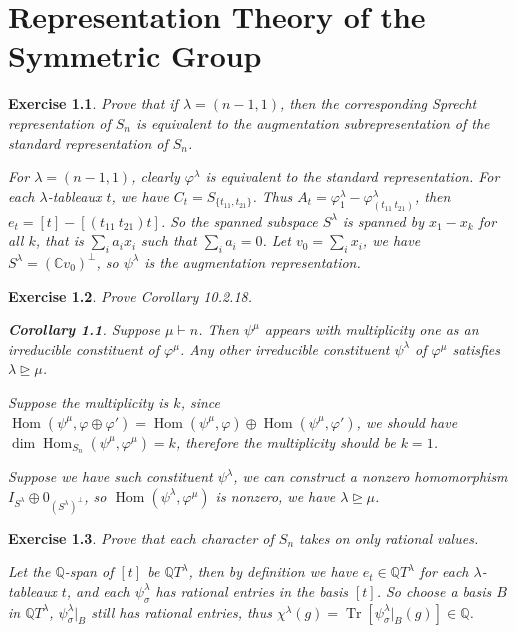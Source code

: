 \documentclass[11pt]{report}
\newtheorem*{corollary}{Corollary}
\theoremstyle{mythm}
\let\oldendproof\endproof
\renewenvironment{proof}[1][\proofname]{%
  \oldproof[\normalfont \bfseries #1]%
}{\oldendproof}
\newtheorem{exercise}{Exercise}[chapter]
\renewcommand*{\proofname}{Proof}
\theoremstyle{myans}
\newcommand{\bbQ}{\mathbb Q}
\newcommand{\bbC}{\mathbb C}
\DeclareMathOperator{\Hom}{Hom}
\DeclareMathOperator{\Tr}{Tr}
\begin{document}
\setcounter{chapter}{9}
\chapter{Representation Theory of the Symmetric Group}

\setcounter{exercise}{2}
\begin{exercise}
  Prove that if $\lambda = (n - 1, 1)$, then the corresponding Sprecht
  representation of $S_n$ is equivalent to the augmentation subrepresentation of the
  standard representation of $S_n$.
  \begin{proof}
    For $\lambda = (n-1, 1)$, clearly $\varphi^\lambda$ is equivalent to the standard representation.
    For each $\lambda$-tableaux $t$, we have $C_t = S_{\{t_{11}, t_{21}\}}$. Thus
    $A_t = \varphi_1^\lambda - \varphi_{(t_{11}\ t_{21})}^\lambda$, then
    $e_t = [t] - [(t_{11}\ t_{21})t]$. So the spanned subspace $S^\lambda$ is spanned by $x_1 - x_k$ for all $k$,
    that is $\sum_i a_i x_i$ such that $\sum_i a_i = 0$. Let $v_0 = \sum_i x_i$, we have
    $S^\lambda = (\bbC v_0)^\perp$, so $\psi^\lambda$ is the augmentation representation.
  \end{proof}
\end{exercise}

\setcounter{exercise}{5}
\begin{exercise}
  Prove Corollary 10.2.18.
  \begin{corollary}
    Suppose $μ \vdash n$. Then $\psi^\mu$ appears with multiplicity one as an irreducible constituent
    of $\varphi^\mu$. Any other irreducible constituent $\psi^\lambda$ of $\varphi^\mu$
    satisfies $\lambda \trianglerighteq \mu$.
  \end{corollary}
  \begin{proof}
    Suppose the multiplicity is $k$, since $\Hom(\psi^\mu, \varphi \oplus \varphi')
    = \Hom(\psi^\mu, \varphi) \oplus \Hom(\psi^\mu, \varphi')$, we should have
    $\dim \Hom_{S_n}(\psi^\mu, \varphi^\mu) = k$, therefore the multiplicity should be $k=1$.

    Suppose we have such constituent $\psi^\lambda$, we can construct a nonzero homomorphism
    $I_{S^\lambda} \oplus 0_{(S^\lambda)^\perp}$, so $\Hom(\psi^\lambda, \varphi^\mu)$ is nonzero,
    we have $\lambda \trianglerighteq \mu$.
  \end{proof}
\end{exercise}

\begin{exercise}
  Prove that each character of $S_n$ takes on only rational values.
  \begin{proof}
    Let the $\bbQ$-span of $[t]$ be $\bbQ T^\lambda$, then by definition we have
    $e_t \in \bbQ T^\lambda$ for each $\lambda$-tableaux $t$, and each $\psi^\lambda_\sigma$
    has rational entries in the basis $[t]$. So choose a basis $B$ in $\bbQ T^\lambda$,
    $\psi^\lambda_\sigma |_{B}$ still has rational entries, thus
    $\chi^\lambda(g) = \Tr \left[\psi^\lambda_\sigma |_{B}(g)\right] \in \bbQ$.
  \end{proof}
\end{exercise}
\end{document}
